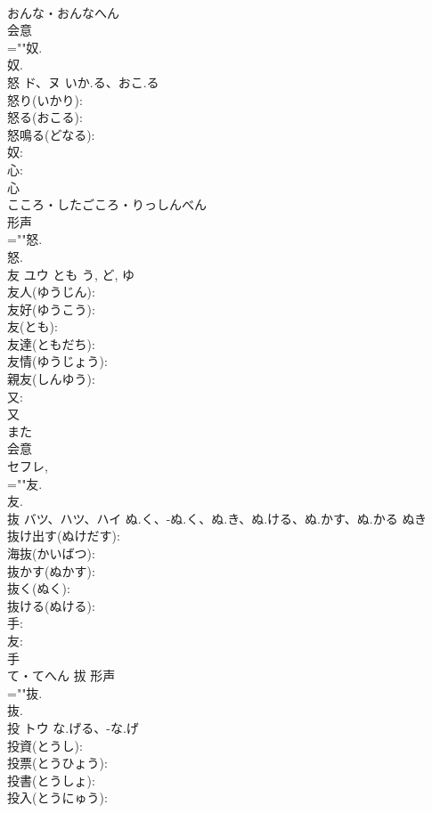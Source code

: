 \documentclass[8pt]{extreport}
\begin{document}
\begin{CJK}{UTF8}{min}
\\	おんな・おんなへん	
\\	会意 
\\	=""奴.
\\	奴.
\\	怒	ド、ヌ	いか.る、おこ.る		
\\	怒り(いかり): 
\\	怒る(おこる): 
\\	怒鳴る(どなる): 
\\	奴: 
\\	心: 
\\	心	
\\	こころ・したごころ・りっしんべん	
\\	形声 
\\	=""怒.
\\	怒.
\\	友	ユウ	とも	う, ど, ゆ	
\\	友人(ゆうじん): 
\\	友好(ゆうこう): 
\\	友(とも): 
\\	友達(ともだち): 
\\	友情(ゆうじょう): 
\\	親友(しんゆう): 
\\	又: 
\\	又	
\\	また	
\\	会意 
\\	セフレ, 
\\	=""友.
\\	友.
\\	抜	バツ、ハツ、ハイ	ぬ.く、-ぬ.く、ぬ.き、ぬ.ける、ぬ.かす、ぬ.かる	ぬき	
\\	抜け出す(ぬけだす): 
\\	海抜(かいばつ): 
\\	抜かす(ぬかす): 
\\	抜く(ぬく): 
\\	抜ける(ぬける): 
\\	手: 
\\	友: 
\\	手	
\\	て・てへん	拔	形声 
\\	=""抜.
\\	抜.
\\	投	トウ	な.げる、-な.げ		
\\	投資(とうし): 
\\	投票(とうひょう): 
\\	投書(とうしょ): 
\\	投入(とうにゅう): 

\end{CJK}
\end{document}
